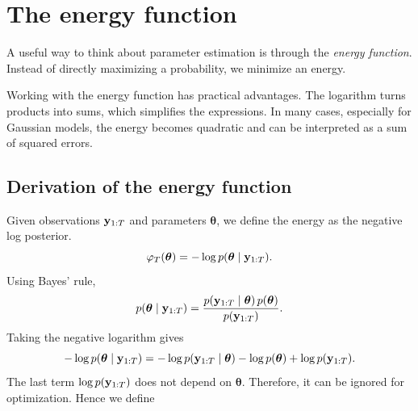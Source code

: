 \section{The energy function}\label{sec:energy-function}
A useful way to think about parameter estimation is through the \textit{energy function}. Instead of directly maximizing a probability, we minimize an energy.

Working with the energy function has practical advantages. The logarithm turns products into sums, which simplifies the expressions. In many cases, especially for Gaussian models, the energy becomes quadratic and can be interpreted as a sum of squared errors.

\subsection{Derivation of the energy function}
Given observations $\mathbf{y}_{1:T}$ and parameters $\boldsymbol{\theta}$, we define the energy as the negative log posterior. 
\begin{equation}
    \varphi_T(\boldsymbol{\theta}) = -\log p(\boldsymbol{\theta} \mid \mathbf{y}_{1:T}).
\end{equation}
Using Bayes' rule,
\begin{equation}
    p(\boldsymbol{\theta} \mid \mathbf{y}_{1:T}) = \frac{p(\mathbf{y}_{1:T} \mid \boldsymbol{\theta})\, p(\boldsymbol{\theta})}{p(\mathbf{y}_{1:T})}.
\end{equation}
Taking the negative logarithm gives
\begin{equation}
    -\log p(\boldsymbol{\theta} \mid \mathbf{y}_{1:T}) = -\log p(\mathbf{y}_{1:T} \mid \boldsymbol{\theta})-\log p(\boldsymbol{\theta})+\log p(\mathbf{y}_{1:T}).
\end{equation}
The last term $\log p(\mathbf{y}_{1:T})$ does not depend on $\boldsymbol{\theta}$. Therefore, it can be ignored for optimization. Hence we define

